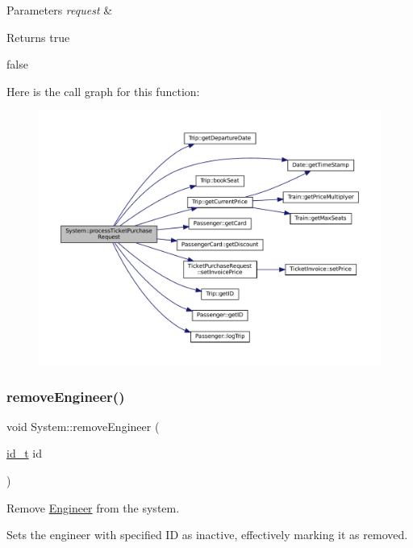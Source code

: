 \begin{DoxyParams}{Parameters}
{\em request} & \\
\hline
\end{DoxyParams}
\begin{DoxyReturn}{Returns}
true 

false 
\end{DoxyReturn}
Here is the call graph for this function\+:
\nopagebreak
\begin{figure}[H]
\begin{center}
\leavevmode
\includegraphics[width=350pt]{classSystem_ac2b6f3d934b64f4fa56ffb1db1d261df_cgraph}
\end{center}
\end{figure}
\mbox{\label{classSystem_a73bc771e0038b7b7b08a185edc2354f4}} 
\subsubsection{\texorpdfstring{remove\+Engineer()}{removeEngineer()}}
{\footnotesize\ttfamily void System\+::remove\+Engineer (\begin{DoxyParamCaption}\item[{\mbox{\hyperlink{project__utils_8h_a8f3a969054ad2200720b96e7e23dd4e1}{id\+\_\+t}}}]{id }\end{DoxyParamCaption})}



Remove \mbox{\hyperlink{classEngineer}{Engineer}} from the system. 

Sets the engineer with specified ID as inactive, effectively marking it as removed.



